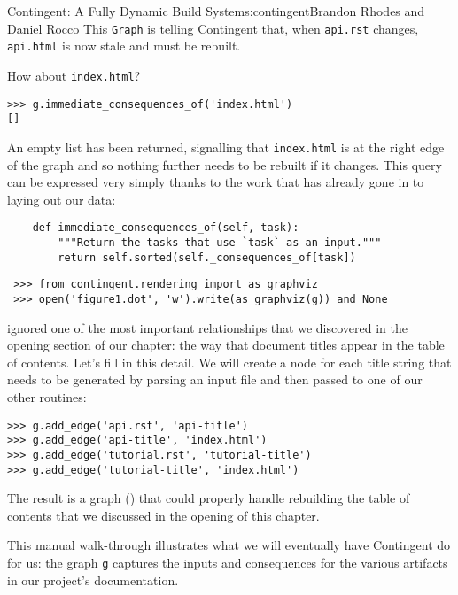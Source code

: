 \begin{aosachapter}{Contingent: A Fully Dynamic Build System}{s:contingent}{Brandon Rhodes and Daniel Rocco}
This \texttt{Graph} is telling Contingent that, when \texttt{api.rst}
changes, \texttt{api.html} is now stale and must be rebuilt.

How about \texttt{index.html}?

\begin{verbatim}
>>> g.immediate_consequences_of('index.html')
[]
\end{verbatim}

An empty list has been returned, signalling that \texttt{index.html} is
at the right edge of the graph and so nothing further needs to be
rebuilt if it changes. This query can be expressed very simply thanks to
the work that has already gone in to laying out our data:

\begin{verbatim}
    def immediate_consequences_of(self, task):
        """Return the tasks that use `task` as an input."""
        return self.sorted(self._consequences_of[task])
\end{verbatim}

\begin{verbatim}
 >>> from contingent.rendering import as_graphviz
 >>> open('figure1.dot', 'w').write(as_graphviz(g)) and None
\end{verbatim}

 ignored one of the most important
relationships that we discovered in the opening section of our chapter:
the way that document titles appear in the table of contents. Let's fill
in this detail. We will create a node for each title string that needs
to be generated by parsing an input file and then passed to one of our
other routines:

\begin{verbatim}
>>> g.add_edge('api.rst', 'api-title')
>>> g.add_edge('api-title', 'index.html')
>>> g.add_edge('tutorial.rst', 'tutorial-title')
>>> g.add_edge('tutorial-title', 'index.html')
\end{verbatim}

The result is a graph () that could
properly handle rebuilding the table of contents that we discussed in
the opening of this chapter.


This manual walk-through illustrates what we will eventually have
Contingent do for us: the graph \texttt{g} captures the inputs and
consequences for the various artifacts in our project's documentation.


\end{aosachapter}
